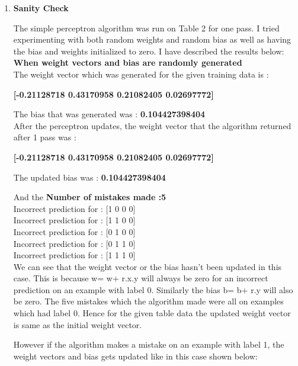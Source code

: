 \documentclass[12pt, fullpage,letterpaper]{article}
\begin{document}
	\begin{enumerate}
		\item \textbf{ Sanity Check}
		
		The simple perceptron algorithm was run on Table 2 for one pass. I tried experimenting with both random weights and random bias as well as having the bias and weights initialized to zero. I have described the results below:\\
	
		\textbf{ When weight vectors and bias are randomly generated }\\
		
		The weight vector which was generated for the given training data is : 
		
		\textbf{[-0.21128718  0.43170958  0.21082405  0.02697772]}
		
		The bias that was generated was : \textbf{0.104427398404
		}\\
		
		After the perceptron updates, the weight vector that the algorithm returned after 1 pass was :
		
		\textbf{[-0.21128718  0.43170958  0.21082405  0.02697772]}
		
		The updated bias was : \textbf{0.104427398404
		}
		
		And the \textbf{ Number of mistakes made :5}\\
		
		Incorrect prediction for : [1 0 0 0]\\
		Incorrect prediction for : [1 1 0 0]\\
		Incorrect prediction for : [0 1 0 0]\\
		Incorrect prediction for : [0 1 1 0]\\
		Incorrect prediction for : [1 1 1 0]\\
		
		We can see that the weight vector or the bias hasn't been updated in this case. This is because w= w+ r.x.y will	always be zero for an incorrect  prediction on an example with label 0. Similarly the bias b= b+ r.y will also be zero. The five mistakes which the algorithm made were all on examples which had label 0. Hence for the given table data the updated weight vector is same as the initial weight vector.
		
		However if the algorithm makes a mistake on an example with label 1, the weight vectors and bias gets updated like in this case shown below:\\
		

\end{enumerate}
\end{document}
